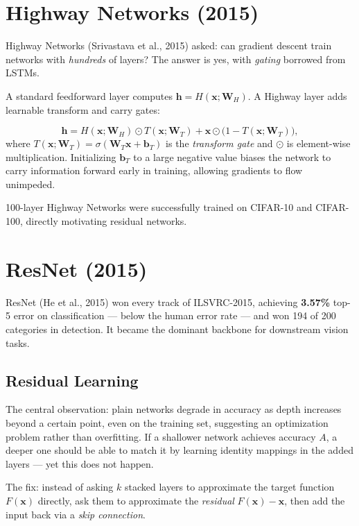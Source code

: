\documentclass[11pt, oneside]{book}
\newcommand{\xvec}{\mathbf{x}}
\newcommand{\hvec}{\mathbf{h}}
\begin{document}
\section{Highway Networks (2015)}

Highway Networks (Srivastava et al., 2015) asked: can gradient descent train
networks with \emph{hundreds} of layers?
The answer is yes, with \emph{gating} borrowed from LSTMs.

A standard feedforward layer computes $\hvec = H(\xvec; \mathbf{W}_H)$.
A Highway layer adds learnable transform and carry gates:

\begin{thmbox}[title={Highway Network Layer}]
\[
  \hvec = H(\xvec;\mathbf{W}_H) \odot T(\xvec;\mathbf{W}_T)
        + \xvec \odot \bigl(1 - T(\xvec;\mathbf{W}_T)\bigr),
\]
where $T(\xvec;\mathbf{W}_T) = \sigma(\mathbf{W}_T\xvec + \mathbf{b}_T)$ is the
\emph{transform gate} and $\odot$ is element-wise multiplication.
Initializing $\mathbf{b}_T$ to a large negative value biases the network to carry
information forward early in training, allowing gradients to flow unimpeded.
\end{thmbox}

100-layer Highway Networks were successfully trained on CIFAR-10 and CIFAR-100,
directly motivating residual networks.

\section{ResNet (2015)}

ResNet (He et al., 2015) won every track of ILSVRC-2015, achieving
\textbf{3.57\%} top-5 error on classification — below the human error rate —
and won 194 of 200 categories in detection.
It became the dominant backbone for downstream vision tasks.

\subsection{Residual Learning}

The central observation: plain networks degrade in accuracy as depth increases
beyond a certain point, even on the training set, suggesting an optimization problem
rather than overfitting.
If a shallower network achieves accuracy $A$, a deeper one should be able to
match it by learning identity mappings in the added layers — yet this does not happen.

The fix: instead of asking $k$ stacked layers to approximate the target function $F(\xvec)$
directly, ask them to approximate the \emph{residual} $F(\xvec) - \xvec$,
then add the input back via a \emph{skip connection}.
\end{document}
